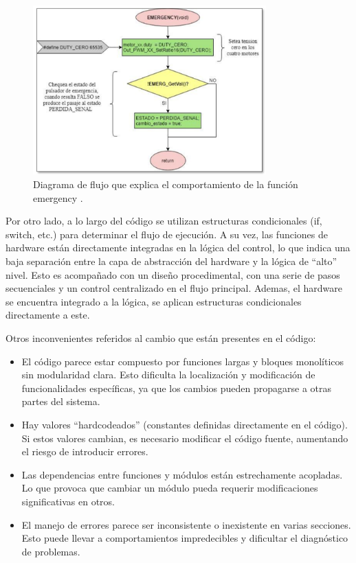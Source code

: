 \begin{figure}[h]
\caption{Diagrama de flujo que explica el comportamiento de la función emergency \cite[pág. 82]{disenioViejo1}.}
\label{diagra}
\begin{centering}
{\includegraphics[width=0.8\textwidth]{diagramaFlujo.png}\par}
\end{centering}
\end{figure}


Por otro lado, a lo largo del código se utilizan estructuras condicionales (if, switch, etc.) para determinar el flujo de ejecución. A su vez, las funciones de hardware están directamente integradas en la lógica del control, lo que indica una baja separación entre la capa de abstracción del hardware y la lógica de ``alto'' nivel. Esto es acompañado con un diseño procedimental, con una serie de pasos secuenciales y un control centralizado en el flujo principal. Ademas, el hardware se encuentra integrado a la lógica, se aplican estructuras condicionales directamente a este.

Otros inconvenientes referidos al cambio que están presentes en el código:
\begin{itemize}
\item El código parece estar compuesto por funciones largas y bloques monolíticos sin modularidad clara. Esto dificulta la localización y modificación de funcionalidades específicas, ya que los cambios pueden propagarse a otras partes del sistema.
\item Hay valores ``hardcodeados'' (constantes definidas directamente en el código). Si estos valores cambian, es necesario modificar el código fuente, aumentando el riesgo de introducir errores.
\item Las dependencias entre funciones y módulos están estrechamente acopladas. Lo que provoca que cambiar un módulo pueda requerir modificaciones significativas en otros.
\item El manejo de errores parece ser inconsistente o inexistente en varias secciones. Esto puede llevar a comportamientos impredecibles y dificultar el diagnóstico de problemas.
\end{itemize}

